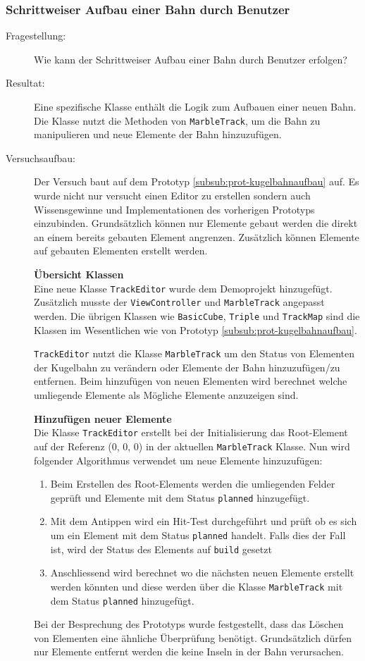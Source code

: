 \subsubsection{Schrittweiser Aufbau einer Bahn durch Benutzer}\label{subsub:prot-kugelbahneditor}
\begin{description}
	\item[Fragestellung:] Wie kann der Schrittweiser Aufbau einer Bahn durch Benutzer erfolgen?
	\item[Resultat:] Eine spezifische Klasse enthält die Logik zum Aufbauen einer neuen Bahn. Die Klasse nutzt die Methoden von \texttt{MarbleTrack}, um die Bahn zu manipulieren und neue Elemente der Bahn hinzuzufügen.
	\item[Versuchsaufbau:] Der Versuch baut auf dem Prototyp \ref{subsub:prot-kugelbahnaufbau} auf. Es wurde nicht nur versucht einen Editor zu erstellen sondern auch Wissensgewinne und Implementationen des vorherigen Prototyps einzubinden. Grundsätzlich können nur Elemente gebaut werden die direkt an einem bereits gebauten Element angrenzen. Zusätzlich können Elemente auf gebauten Elementen erstellt werden. 

	\textbf{Übersicht Klassen}\\
	Eine neue Klasse \texttt{TrackEditor} wurde dem Demoprojekt hinzugefügt. Zusätzlich musste der \texttt{ViewController} und \texttt{MarbleTrack} angepasst werden. Die übrigen Klassen wie \texttt{BasicCube}, \texttt{Triple} und \texttt{TrackMap} sind die Klassen im Wesentlichen wie von Prototyp \ref{subsub:prot-kugelbahnaufbau}.

	\texttt{TrackEditor} nutzt die Klasse \texttt{MarbleTrack} um den Status von Elementen der Kugelbahn zu verändern oder Elemente der Bahn hinzuzufügen/zu entfernen. Beim hinzufügen von neuen Elementen wird berechnet welche umliegende Elemente als Mögliche Elemente anzuzeigen sind.

	\textbf{Hinzufügen neuer Elemente}\\
	Die Klasse \texttt{TrackEditor} erstellt bei der Initialisierung das Root-Element auf der Referenz (0, 0, 0) in der aktuellen \texttt{MarbleTrack} Klasse. Nun wird folgender Algorithmus verwendet um neue Elemente hinzuzufügen:
	
	\begin{enumerate}
		\item Beim Erstellen des Root-Elements werden die umliegenden Felder geprüft und Elemente mit dem Status \texttt{planned} hinzugefügt.
		\item Mit dem Antippen wird ein Hit-Test durchgeführt und prüft ob es sich um ein Element mit dem Status \texttt{planned} handelt. Falls dies der Fall ist, wird der Status des Elements auf \texttt{build} gesetzt
		\item Anschliessend wird berechnet wo die nächsten neuen Elemente erstellt werden könnten und diese werden über die Klasse \texttt{MarbleTrack} mit dem Status \texttt{planned} hinzugefügt.
	\end{enumerate}

	Bei der Besprechung des Prototyps wurde festgestellt, dass das Löschen von Elementen eine ähnliche Überprüfung benötigt. Grundsätzlich dürfen nur Elemente entfernt werden die keine Inseln in der Bahn verursachen.

\end{description}
